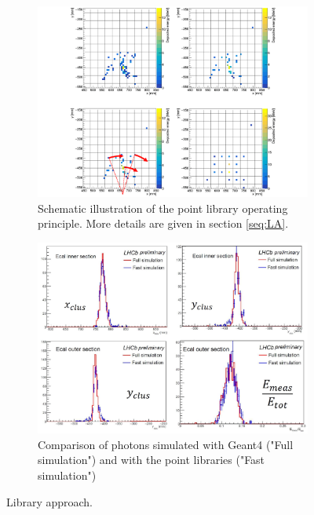 \documentclass{PoS}
\begin{document}
\begin{figure}[htb]
  \begin{center}
   \begin{subfigure}[t]{0.4\textwidth}
    \includegraphics[width=1\textwidth]{figures/pointProcessing.pdf}
    \caption{Schematic illustration of the point library operating
      principle. More details are given in section
      \ref{seq:LA}.\label{fig:pointProcessing}}
  \end{subfigure}
  \hspace{0.04\textwidth}
   \begin{subfigure}[t]{0.52\textwidth}
    \includegraphics[width=1\textwidth]{figures/showerlibPerf.pdf}
    \caption{Comparison of photons simulated with Geant4 ("Full simulation") and with the point libraries ("Fast simulation") \label{fig:showerlibPerf}}
  \end{subfigure}
  \end{center}
\caption{Library approach.}
\end{figure}
\end{document}
